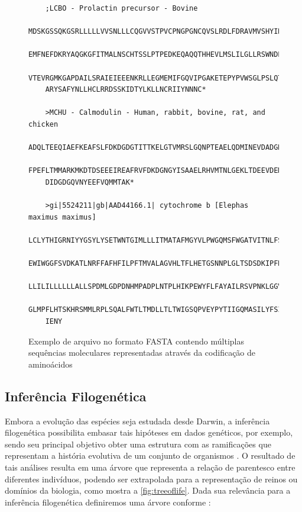 \documentclass[english,brazilian]{UNISINOSmonografia} %
\newcommand\defaultFigureWidth{0.9}
\begin{document}
\begin{figure}[tb]
\centering%
\begin{minipage}{\defaultFigureWidth\textwidth}
	\caption{Exemplo de arquivo no formato FASTA contendo múltiplas sequências moleculares representadas através da codificação de aminoácidos}
	\label{fig:arquivo-fasta}
	\begin{footnotesize}
	\begin{verbatim}
	;LCBO - Prolactin precursor - Bovine
	MDSKGSSQKGSRLLLLLVVSNLLLCQGVVSTPVCPNGPGNCQVSLRDLFDRAVMVSHYIHDLSS
	EMFNEFDKRYAQGKGFITMALNSCHTSSLPTPEDKEQAQQTHHEVLMSLILGLLRSWNDPLYHL
	VTEVRGMKGAPDAILSRAIEIEEENKRLLEGMEMIFGQVIPGAKETEPYPVWSGLPSLQTKDED
	ARYSAFYNLLHCLRRDSSKIDTYLKLLNCRIIYNNNC*
	
	>MCHU - Calmodulin - Human, rabbit, bovine, rat, and chicken
	ADQLTEEQIAEFKEAFSLFDKDGDGTITTKELGTVMRSLGQNPTEAELQDMINEVDADGNGTID
	FPEFLTMMARKMKDTDSEEEIREAFRVFDKDGNGYISAAELRHVMTNLGEKLTDEEVDEMIREA
	DIDGDGQVNYEEFVQMMTAK*
	
	>gi|5524211|gb|AAD44166.1| cytochrome b [Elephas maximus maximus]
	LCLYTHIGRNIYYGSYLYSETWNTGIMLLLITMATAFMGYVLPWGQMSFWGATVITNLFSAIPYIGTNLV
	EWIWGGFSVDKATLNRFFAFHFILPFTMVALAGVHLTFLHETGSNNPLGLTSDSDKIPFHPYYTIKDFLG
	LLILILLLLLLALLSPDMLGDPDNHMPADPLNTPLHIKPEWYFLFAYAILRSVPNKLGGVLALFLSIVIL
	GLMPFLHTSKHRSMMLRPLSQALFWTLTMDLLTLTWIGSQPVEYPYTIIGQMASILYFSIILAFLPIAGX
	IENY
	\end{verbatim}
	\end{footnotesize}
\end{minipage}
\end{figure}





\subsection{Inferência Filogenética}
\label{s:phylogeneticinference}



Embora a evolução das espécies seja estudada desde Darwin, a inferência filogenética possibilita embasar tais hipóteses em dados genéticos, por exemplo, sendo seu principal objetivo obter uma estrutura com as ramificações que representam a história evolutiva de um conjunto de organismos \cite{Zwickl2006}.
O resultado de tais análises resulta em uma árvore que representa a relação de parentesco entre diferentes indivíduos, podendo ser extrapolada para a representação de reinos ou domínios da biologia, como mostra a \autoref{fig:treeoflife}.
Dada sua relevância para a inferência filogenética definiremos uma árvore conforme :
\end{document}
